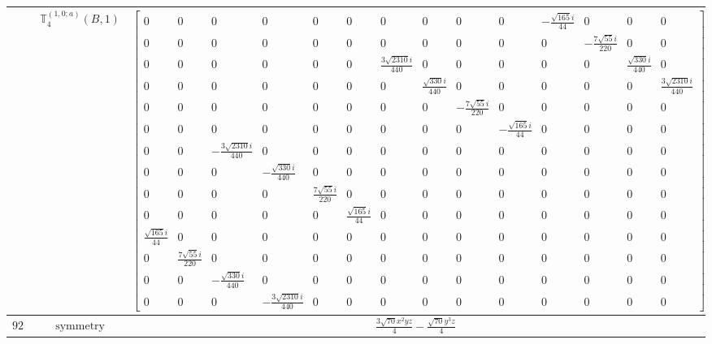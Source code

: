 \documentclass[fleqn,8pt,landscape]{jsarticle}
\begin{document}
\begin{longtable}{ccc}
$  $ & $ \mathbb{T}_{4}^{(1,0;a)}(B,1) $ & $ \begin{bmatrix} 0 & 0 & 0 & 0 & 0 & 0 & 0 & 0 & 0 & 0 & - \frac{\sqrt{165} i}{44} & 0 & 0 & 0 \\ 0 & 0 & 0 & 0 & 0 & 0 & 0 & 0 & 0 & 0 & 0 & - \frac{7 \sqrt{55} i}{220} & 0 & 0 \\ 0 & 0 & 0 & 0 & 0 & 0 & \frac{3 \sqrt{2310} i}{440} & 0 & 0 & 0 & 0 & 0 & \frac{\sqrt{330} i}{440} & 0 \\ 0 & 0 & 0 & 0 & 0 & 0 & 0 & \frac{\sqrt{330} i}{440} & 0 & 0 & 0 & 0 & 0 & \frac{3 \sqrt{2310} i}{440} \\ 0 & 0 & 0 & 0 & 0 & 0 & 0 & 0 & - \frac{7 \sqrt{55} i}{220} & 0 & 0 & 0 & 0 & 0 \\ 0 & 0 & 0 & 0 & 0 & 0 & 0 & 0 & 0 & - \frac{\sqrt{165} i}{44} & 0 & 0 & 0 & 0 \\ 0 & 0 & - \frac{3 \sqrt{2310} i}{440} & 0 & 0 & 0 & 0 & 0 & 0 & 0 & 0 & 0 & 0 & 0 \\ 0 & 0 & 0 & - \frac{\sqrt{330} i}{440} & 0 & 0 & 0 & 0 & 0 & 0 & 0 & 0 & 0 & 0 \\ 0 & 0 & 0 & 0 & \frac{7 \sqrt{55} i}{220} & 0 & 0 & 0 & 0 & 0 & 0 & 0 & 0 & 0 \\ 0 & 0 & 0 & 0 & 0 & \frac{\sqrt{165} i}{44} & 0 & 0 & 0 & 0 & 0 & 0 & 0 & 0 \\ \frac{\sqrt{165} i}{44} & 0 & 0 & 0 & 0 & 0 & 0 & 0 & 0 & 0 & 0 & 0 & 0 & 0 \\ 0 & \frac{7 \sqrt{55} i}{220} & 0 & 0 & 0 & 0 & 0 & 0 & 0 & 0 & 0 & 0 & 0 & 0 \\ 0 & 0 & - \frac{\sqrt{330} i}{440} & 0 & 0 & 0 & 0 & 0 & 0 & 0 & 0 & 0 & 0 & 0 \\ 0 & 0 & 0 & - \frac{3 \sqrt{2310} i}{440} & 0 & 0 & 0 & 0 & 0 & 0 & 0 & 0 & 0 & 0 \end{bmatrix} $ \\ \hline
$ 927 $ & $ \text{symmetry} $ & $ \frac{3 \sqrt{70} x^{2} y z}{4} - \frac{\sqrt{70} y^{3} z}{4} $ \\

\end{longtable}
\end{document}
